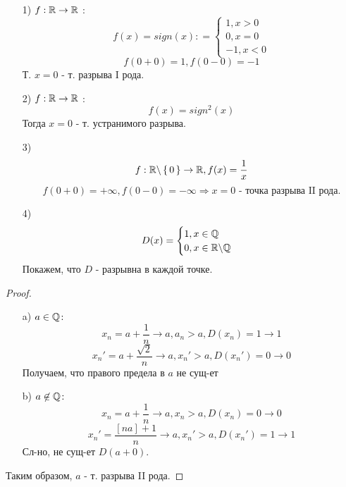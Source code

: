 \begin{example}
\begin{itemize}
  \item [1) ] $f: \mathbb{R} \rightarrow \mathbb{R}$ :
    \[
    f(x) = sign(x) \colon= \begin{cases}
    1, x > 0 \\
    0, x = 0 \\
    -1, x < 0
    \end{cases}
    \]
    \[
    f(0 + 0) = 1, f(0 - 0) = -1
    \]
    Т. $x = 0$ - т. разрыва I рода.

  \item [2) ] $f: \mathbb{R} \rightarrow \mathbb{R}$ :
    \[
    f(x) = sign^{2}(x)
    \]
    Тогда $x = 0$ - т. устранимого разрыва.
  \item [3) ] \[
  f: \mathbb{R} \backslash \set{0} \rightarrow \mathbb{R}, f(x) = \frac{1}{x}
  \]
  \[
  f(0 + 0) = +\infty, f(0 - 0) = -\infty \Rightarrow x = 0 \text{ - точка разрыва II рода.}
  \]
\item [4) ] \[
D(x) = \begin{cases}
1, x \in \mathbb{Q} \\
0, x \in \mathbb{R} \backslash \mathbb{Q}
\end{cases}
\]
Покажем, что $D$ - разрывна в каждой точке.
\end{itemize}
\begin{proof}
\begin{itemize}
  \item [a) ] $ a \in \mathbb{Q} \colon $
    \[
      x_n = a + \frac{1}{n} \rightarrow a, a_n > a, D(x_n) = 1 \rightarrow 1
    \]
    \[
    x_n' = a + \frac{\sqrt{2}}{n} \rightarrow a, x_n' > a, D(x_n') = 0 \rightarrow 0
    \]
    Получаем, что правого предела в $a$ не сущ-ет
  \item [b) ] $a \not\in \mathbb{Q} \colon$
    \[
    x_n = a + \frac{1}{n} \rightarrow a, x_n > a, D(x_n) = 0 \rightarrow 0
    \]
    \[
    x_n' = \frac{[na] + 1}{n} \rightarrow a, x_n' > a, D(x_n') = 1 \rightarrow 1
    \]
    Сл-но, не сущ-ет $D(a + 0)$.
\end{itemize}
Таким образом, $a$ - т. разрыва II рода.
\end{proof}
\end{example}
